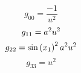 \begin{dmath}
g_{00}=\frac{-1}{u^2}
\end{dmath}
\begin{dmath}
g_{11}=a^2\*u^2
\end{dmath}
\begin{dmath}
g_{22}=\sin\left(x_{1}\right)^2\*a^2\*u^2
\end{dmath}
\begin{dmath}
g_{33}=u^2
\end{dmath}
